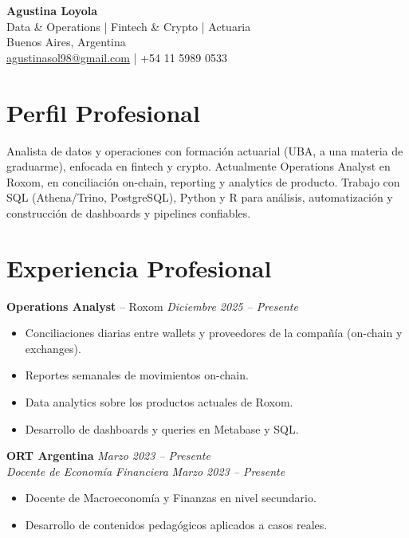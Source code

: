 \documentclass[10pt, letterpaper]{article}
\begin{document}
\begin{center}
    {\LARGE \textbf{Agustina Loyola}} \\
    Data \& Operations | Fintech \& Crypto | Actuaria \\
    Buenos Aires, Argentina \\
    \href{mailto:agustinasol98@gmail.com}{agustinasol98@gmail.com} \quad | \quad +54 11 5989 0533 \\
    \end{center}
\vspace{0.1cm}

\section*{Perfil Profesional}
Analista de datos y operaciones con formación actuarial (UBA, a una materia de graduarme), enfocada en fintech y crypto. Actualmente Operations Analyst en Roxom, en conciliación on-chain, reporting y analytics de producto. Trabajo con SQL (Athena/Trino, PostgreSQL), Python y R para análisis, automatización y construcción de dashboards y pipelines confiables.

\section*{Experiencia Profesional}

\textbf{Operations Analyst} – Roxom \hfill \textit{Diciembre 2025 – Presente}
\begin{itemize}
    \item Conciliaciones diarias entre wallets y proveedores de la compañía (on-chain y exchanges).
    \item Reportes semanales de movimientos on-chain.
    \item Data analytics sobre los productos actuales de Roxom.
    \item Desarrollo de dashboards y queries en Metabase y SQL.
\end{itemize}
\vspace{0.1cm}

\textbf{ORT Argentina} \hfill \textit{Marzo 2023 – Presente} \\[3pt]
\textit{Docente de Economía Financiera} \hfill \textit{Marzo 2023 – Presente}
\begin{itemize}
    \item Docente de Macroeconomía y Finanzas en nivel secundario.
    \item Desarrollo de contenidos pedagógicos aplicados a casos reales.
\end{itemize}
\end{document}
